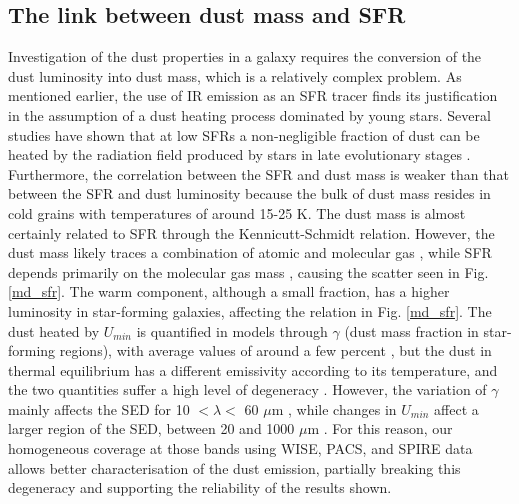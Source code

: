 \documentclass{aa}
\begin{document}
\subsection{The link between dust mass and SFR}

Investigation of the dust properties in a galaxy requires the conversion of the dust luminosity into dust mass, which is a relatively  complex problem. As mentioned earlier, the use of IR emission as an SFR tracer finds its justification in the assumption of a dust heating process dominated by young stars. Several studies have shown that at low SFRs a non-negligible fraction of dust can be heated by the radiation field produced by stars in late evolutionary stages \citep{lon,ben,ben2,ben3, via2,via,boq2}. Furthermore, the correlation between the SFR and dust mass is weaker than that  between
the SFR and dust luminosity \citep{cle,smi,pap2} because the bulk of dust mass resides in cold grains with temperatures of around 15-25 K. The dust mass is almost certainly related to SFR through the Kennicutt-Schmidt relation. However, the dust mass likely traces a combination of atomic and molecular gas \citep{pap3}, while SFR depends primarily on the molecular gas mass \citep[e.g.][]{big}, causing the scatter seen in Fig. \ref{md_sfr}. The warm component, although a small fraction, has a higher luminosity in star-forming galaxies, affecting the relation in Fig. \ref{md_sfr}. The dust heated by $U_{min}$ is quantified in \cite{dra} models through $\gamma$ (dust mass fraction in star-forming regions), with average values of around a few percent \citep{bia}, but the dust in thermal equilibrium has a different emissivity according to its temperature, and the two quantities suffer a high level of degeneracy \citep{juv}. However, the variation of $\gamma$  mainly affects the SED for 10 $< \lambda <$ 60 $\mu$m \citep[Fig. 18 of][]{dra}, while changes in $U_{min}$ affect a larger region of the SED, between 20 and 1000 $\mu$m \citep[Fig. 13 of][]{dra}. For this reason, our homogeneous coverage at those bands using WISE, PACS, and SPIRE data allows better characterisation of the dust emission, partially breaking this degeneracy and supporting the reliability of the results shown.
\end{document}

